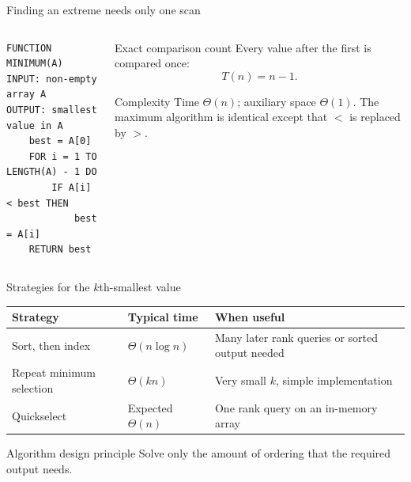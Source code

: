 \documentclass[aspectratio=169]{beamer}
\begin{document}
\begin{frame}[fragile]{Finding an extreme needs only one scan}
  \begin{columns}[T]
    \begin{column}{0.57\textwidth}
\begin{lstlisting}[style=pseudonumbered]
FUNCTION MINIMUM(A)
INPUT: non-empty array A
OUTPUT: smallest value in A
    best = A[0]
    FOR i = 1 TO LENGTH(A) - 1 DO
        IF A[i] < best THEN
            best = A[i]
    RETURN best
\end{lstlisting}
    \end{column}
    \begin{column}{0.39\textwidth}
      \begin{block}{Exact comparison count}
        Every value after the first is compared once:
        \[
          T(n)=n-1.
        \]
      \end{block}
      \begin{exampleblock}{Complexity}
        Time $\Theta(n)$; auxiliary space $\Theta(1)$. The maximum algorithm is
        identical except that $<$ is replaced by $>$.
      \end{exampleblock}
    \end{column}
  \end{columns}
\end{frame}

\begin{frame}{Strategies for the $k$th-smallest value}
  \small
  \begin{center}
    \begin{tabular}{L{0.24\textwidth}L{0.25\textwidth}L{0.35\textwidth}}
      \toprule
      \textbf{Strategy} & \textbf{Typical time} & \textbf{When useful} \\
      \midrule
      Sort, then index & $\Theta(n\log n)$ & Many later rank queries or sorted output needed \\
      Repeat minimum selection & $\Theta(kn)$ & Very small $k$, simple implementation \\
      Quickselect & Expected $\Theta(n)$ & One rank query on an in-memory array \\
      \bottomrule
    \end{tabular}
  \end{center}
  \begin{alertblock}{Algorithm design principle}
    Solve only the amount of ordering that the required output needs.
  \end{alertblock}
\end{frame}
\end{document}
